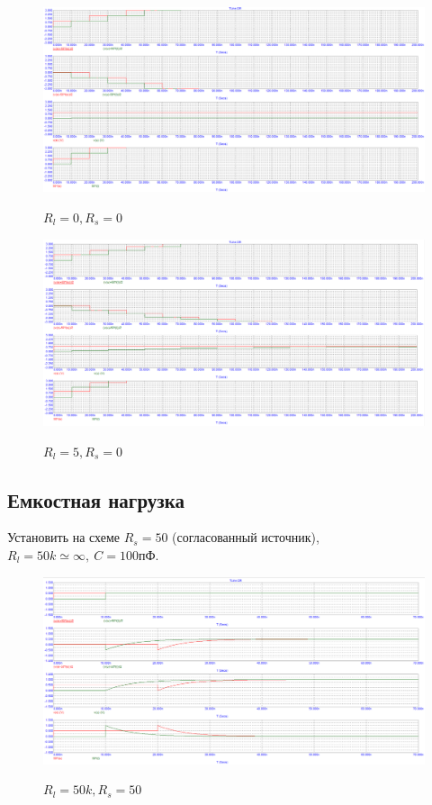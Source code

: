 \documentclass[a4paper, 12pt]{article}%
\begin{document}
\begin{figure}[h!]
\centering
\includegraphics[scale=0.4]{images/Graph13.png}
\label{fig:Image1}
\caption{$R_l = 0, R_s = 0$}
\end{figure}

\begin{figure}[h!]
\centering
\includegraphics[scale=0.4]{images/Graph14.png}
\label{fig:Image1}
\caption{$R_l = 5, R_s = 0$}
\end{figure}

\subsection*{Емкостная нагрузка}

Установить на схеме $R_s = 50$ (согласованный источник), $R_l = 50k \simeq \infty, \: C = 100 \textit{пФ}$.

\begin{figure}[h!]
\centering
\includegraphics[scale=0.4]{images/Graph15.png}
\label{fig:Image1}
\caption{$R_l = 50k, R_s = 50$}
\end{figure}
\end{document}
